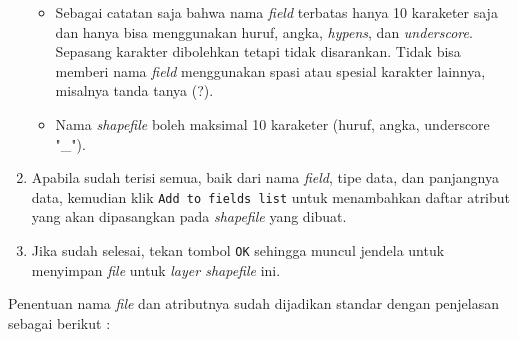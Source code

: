 \begin{enumerate}[1.]
\begin{itemize}
    \item Sebagai catatan saja bahwa nama \textit{field} terbatas hanya 10 karaketer saja dan hanya bisa menggunakan huruf, angka, \textit{hypens}, dan \textit{underscore}. Sepasang karakter dibolehkan tetapi tidak disarankan. Tidak bisa memberi nama \textit{field} menggunakan spasi atau spesial karakter lainnya, misalnya tanda tanya (?).
    
    \item Nama \textit{shapefile} boleh maksimal 10 karaketer (huruf, angka, underscore "\_").
  
  \end{itemize}
  
  \item Apabila sudah terisi semua, baik dari nama \textit{field}, tipe data, dan panjangnya data, kemudian klik \texttt{Add to fields list} untuk menambahkan daftar atribut yang akan dipasangkan pada \textit{shapefile} yang dibuat.
  
  \item Jika sudah selesai, tekan tombol \verb|OK| sehingga muncul jendela untuk menyimpan \textit{file} untuk \textit{layer shapefile} ini.

\end{enumerate}

Penentuan nama \textit{file} dan atributnya sudah dijadikan standar dengan penjelasan sebagai berikut :

